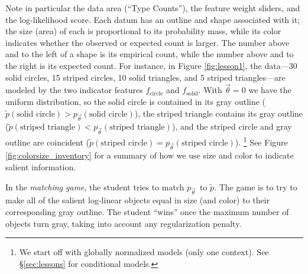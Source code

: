 \documentclass[11pt,letterpaper]{article}
\newcommand{\Note}[1]{}
\renewcommand{\Note}[1]{\hl{[#1]}}  %
\newcommand{\NoteSigned}[3]{{\sethlcolor{#2}\Note{#1: #3}}}
\newcommand{\NoteJE}[1]{\NoteSigned{JE}{LightGreen}{#1}}
\newcommand{\Commented}[1]{#1}
\newcommand{\empirical}[0]{\ensuremath{\tilde{p}}}
\begin{document}

Note in particular the data area (``Type Counts''), the
feature weight sliders, and the log-likelihood score. 
Each datum has an outline and shape associated with it; the size (area) of
each is proportional to its probability mass, while its color
indicates whether the observed or expected count is larger.  The
number above and to the left of a shape is its empirical
count, while the number above and to the right is its expected count.
For instance, in Figure \ref{fig:lesson1}, the data---30 solid
circles, 15 striped circles, 10 solid triangles, and 5 striped
triangles---are modeled by the two indicator features
$f_{\textrm{circle}}$ and $f_{\textrm{solid}}$. With $\vec{\theta} =
0$ we have the uniform distribution, so the solid circle is contained
in its gray outline ($\empirical{}(\textrm{solid circle}) >
p_{\vec{\theta}}(\textrm{solid circle})$), the striped triangle
contains its gray outline ($\empirical{}(\textrm{striped triangle}) <
p_{\vec{\theta}}(\textrm{striped triangle})$), and the striped
circle and gray outline are coincident ($\empirical{}(\textrm{striped
  circle}) = p_{\vec{\theta}}(\textrm{striped circle})$).
\footnote{We start off with globally normalized models (only one 
context). See \S\ref{sec:lessons} for conditional models.}  
See Figure \ref{fig:colorsize_inventory}
for a summary of how we use size and color to indicate salient
information.

In the \textit{matching game}, the student tries to match $p_{\vec{\theta}}$\ to  $\tilde{p}$. 
The game is to try to make all of the salient log-linear objects 
equal in size (and color) to their corresponding gray outline. 
The student ``wins'' once the maximum number of objects turn gray, 
taking into account any regularization penalty.
\end{document}
